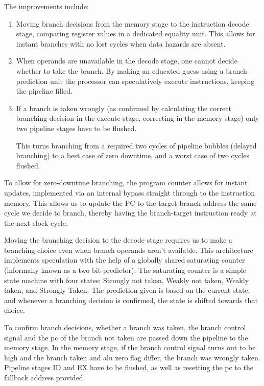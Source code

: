 The improvements include:
\begin{enumerate}
  \item
    Moving branch decisions from the memory stage to the instruction decode stage, comparing register values in a dedicated equality unit.
    This allows for instant branches with no lost cycles when data hazards are absent.
  \item
    When operands are unavailable in the decode stage, one cannot decide whether to take the branch.
    By making an educated guess using a branch prediction unit the processor can speculatively execute instructions, keeping the pipeline filled.
  \item
    If a branch is taken wrongly (as confirmed by calculating the correct branching decision in the execute stage, correcting in the memory stage) only two pipeline stages have to be flushed.

    This turns branching from a required two cycles of pipeline bubbles (delayed branching) to a best case of zero downtime, and a worst case of two cycles flushed.
\end{enumerate}

To allow for zero-downtime branching, the program counter allows for instant updates, implemented via an internal bypass straight through to the instruction memory.
This allows us to update the PC to the target branch address the same cycle we decide to branch, thereby having the branch-target instruction ready at the next clock cycle.

Moving the branching decision to the decode stage requires us to make a branching choice even when branch operands aren't available.
This architecture implements speculation with the help of a globally shared saturating counter (informally known as a two bit predictor).
The saturating counter is a simple state machine with four states: Strongly not taken, Weakly not taken, Weakly taken, and Strongly Taken.
The prediction given is based on the current state, and whenever a branching decision is confirmed, the state is shifted towards that choice.

To confirm branch decisions, whether a branch was taken, the branch control signal and the pc of the branch not taken are passed down the pipeline to the memory stage.
In the memory stage, if the branch control signal turns out to be high and the branch taken and alu zero flag differ, the branch was wrongly taken.
Pipeline stages ID and EX have to be flushed, as well as resetting the pc to the fallback address provided.
